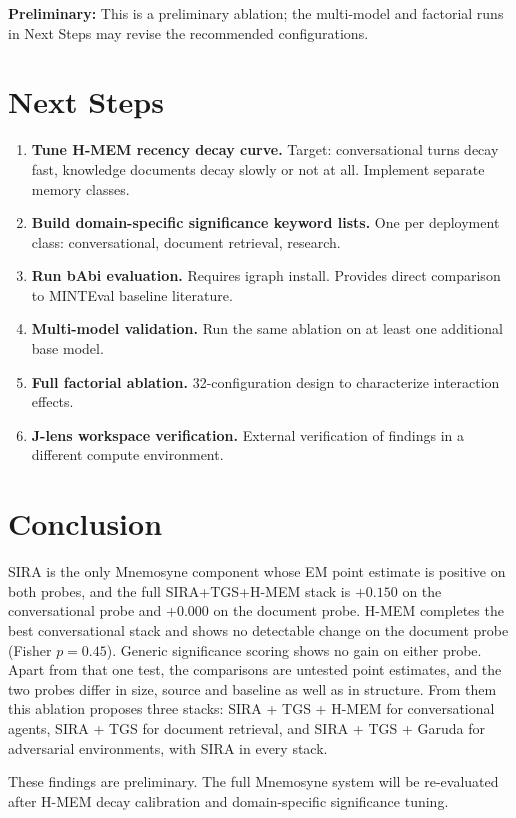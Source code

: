 \documentclass[11pt,a4paper]{article}
\begin{document}
\textbf{Preliminary:} This is a preliminary ablation; the multi-model and factorial runs in Next Steps may revise the recommended configurations.

\section{Next Steps}

\begin{enumerate}
  \item \textbf{Tune H-MEM recency decay curve.} Target: conversational turns decay fast, knowledge documents decay slowly or not at all. Implement separate memory classes.
  \item \textbf{Build domain-specific significance keyword lists.} One per deployment class: conversational, document retrieval, research.
  \item \textbf{Run bAbi evaluation.} Requires igraph install. Provides direct comparison to MINTEval baseline literature.
  \item \textbf{Multi-model validation.} Run the same ablation on at least one additional base model.
  \item \textbf{Full factorial ablation.} 32-configuration design to characterize interaction effects.
  \item \textbf{J-lens workspace verification.} External verification of findings in a different compute environment.
\end{enumerate}

\section{Conclusion}

SIRA is the only Mnemosyne component whose EM point estimate is positive on both probes, and the full SIRA+TGS+H-MEM stack is $+0.150$ on the conversational probe and $+0.000$ on the document probe. H-MEM completes the best conversational stack and shows no detectable change on the document probe (Fisher $p=0.45$). Generic significance scoring shows no gain on either probe. Apart from that one test, the comparisons are untested point estimates, and the two probes differ in size, source and baseline as well as in structure. From them this ablation proposes three stacks: SIRA + TGS + H-MEM for conversational agents, SIRA + TGS for document retrieval, and SIRA + TGS + Garuda for adversarial environments, with SIRA in every stack.

These findings are preliminary. The full Mnemosyne system will be re-evaluated after H-MEM decay calibration and domain-specific significance tuning.
\end{document}
